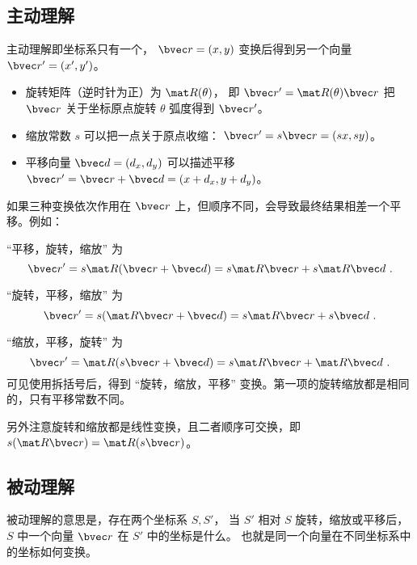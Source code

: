 

\subsection{主动理解}
主动理解即坐标系只有一个， $\bvec r = (x, y)$ 变换后得到另一个向量 $\bvec r' = (x',y')$。

\begin{itemize}
\item 旋转矩阵（逆时针为正）为 $\mat R(\theta)$， 即 $\bvec r' = \mat R(\theta)\bvec r$ 把 $\bvec r$ 关于坐标原点旋转 $\theta$ 弧度得到 $\bvec r'$。
\item 缩放常数 $s$ 可以把一点关于原点收缩： $\bvec r' = s\bvec r = (sx, sy)$。
\item 平移向量 $\bvec d = (d_x,d_y)$ 可以描述平移 $\bvec r' = \bvec r + \bvec d = (x+d_x,y+d_y)$。
\end{itemize}

如果三种变换依次作用在 $\bvec r$ 上，但顺序不同，会导致最终结果相差一个平移。例如：

“平移，旋转，缩放” 为
\begin{equation}
\bvec r' = s\mat R (\bvec r + \bvec d) = s\mat R\bvec r + s\mat R\bvec d~.
\end{equation}

“旋转，平移，缩放” 为
\begin{equation}
\bvec r' = s(\mat R\bvec r + \bvec d) = s\mat R\bvec r + s\bvec d~.
\end{equation}

“缩放，平移，旋转” 为
\begin{equation}
\bvec r' = \mat R(s\bvec r + \bvec d) = s\mat R\bvec r + \mat R\bvec d~.
\end{equation}
可见使用拆括号后，得到 “旋转，缩放，平移” 变换。第一项的旋转缩放都是相同的，只有平移常数不同。

另外注意旋转和缩放都是线性变换，且二者顺序可交换，即 $s(\mat R\bvec r) = \mat R (s \bvec r)$。

\subsection{被动理解}
被动理解的意思是，存在两个坐标系 $S,S'$， 当 $S'$ 相对 $S$ 旋转，缩放或平移后， $S$ 中一个向量 $\bvec r$ 在 $S'$ 中的坐标是什么。 也就是同一个向量在不同坐标系中的坐标如何变换。

